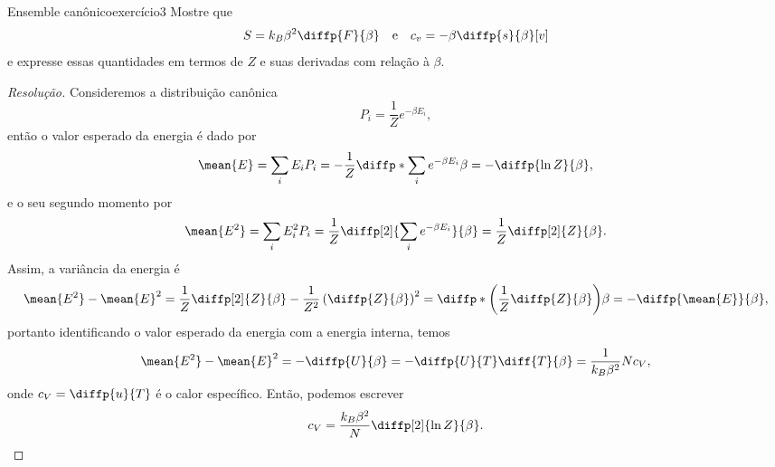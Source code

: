 \begin{exercício}{Ensemble canônico}{exercício3}
    Mostre que
    \begin{equation*}
        S = k_B \beta^2 \diffp{F}{\beta}
        \quad\text{e}\quad
        c_v = - \beta \diffp{s}{\beta}[v]
    \end{equation*}
    e expresse essas quantidades em termos de \(Z\) e suas derivadas com relação à \(\beta\).
\end{exercício}
\begin{proof}[Resolução]
    Consideremos a distribuição canônica
    \begin{equation*}
        P_i = \frac{1}{Z}e^{-\beta E_i},
    \end{equation*}
    então o valor esperado da energia é dado por
    \begin{equation*}
        \mean{E} = \sum_{i} E_i P_i = -\frac{1}{Z} \diffp*{\sum_{i}{e^{-\beta E_i}}}{\beta} = - \diffp{\ln Z}{\beta},
    \end{equation*}
    e o seu segundo momento por
    \begin{equation*}
        \mean{E^2} = \sum_{i} E_i^2 P_i = \frac{1}{Z}\diffp[2]{\sum_i{e^{-\beta E_i}}}{\beta} = \frac{1}{Z} \diffp[2]{Z}{\beta}.
    \end{equation*}
    Assim, a variância da energia é
    \begin{equation*}
        \mean{E^2} - \mean{E}^2 = \frac{1}{Z}\diffp[2]{Z}{\beta} - \frac{1}{Z^2} \left(\diffp{Z}{\beta}\right)^2 = \diffp*{\left(\frac{1}{Z}\diffp{Z}{\beta}\right)}{\beta} = - \diffp{\mean{E}}{\beta},
    \end{equation*}
    portanto identificando o valor esperado da energia com a energia interna, temos
    \begin{equation*}
        \mean{E^2} - \mean{E}^2 = - \diffp{U}{\beta} = -\diffp{U}{T} \diff{T}{\beta} = \frac{1}{k_B \beta^2} N c_V,
    \end{equation*}
    onde \(c_V = \diffp{u}{T}\) é o calor específico. Então, podemos escrever
    \begin{equation*}
        c_V = \frac{k_B \beta^2}{N} \diffp[2]{\ln Z}{\beta}.
    \end{equation*}


\end{proof}
